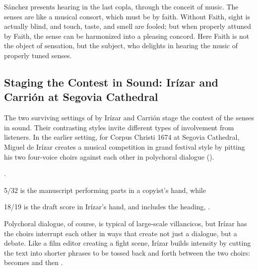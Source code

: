 Sánchez presents hearing in the last copla, through the conceit of music.
The senses are  like a musical consort, which must be  by faith.
Without Faith, sight is actually blind, and touch, taste, and smell are fooled; but when properly attuned by Faith, the sense can be harmonized into a pleasing concord.
Here Faith is not the object of sensation, but the subject, who delights in hearing the music of properly tuned senses.

\subsection{Staging the Contest in Sound: Irízar and Carrión at Segovia Cathedral}


The two surviving settings of  by Irízar and Carrión stage the contest of the senses in sound.
Their contrasting styles invite different types of involvement from listeners.
In the earlier setting, for Corpus Christi 1674 at Segovia Cathedral, Miguel de Irízar creates a musical competition in grand festival style by pitting his two four-voice choirs against each other in polychoral dialogue ().%
\begin{Footnote}
    \Autocite[\XXX]{Cashner:SingingAboutSingingI}.
    \signature{E-SE}{5/32} is the manuscript performing parts in a copyist's hand, while \signature{E-SE}{18/19} is the draft score in Irízar's hand, and includes the heading, .
\end{Footnote}
Polychoral dialogue, of course, is typical of large-scale villancicos, but Irízar has the choirs interrupt each other in ways that create not just a dialogue, but a debate.
Like a film editor creating a fight scene, Irízar builds intensity by cutting the text into shorter phrases to be tossed back and forth between the two choirs:  becomes  and then .


